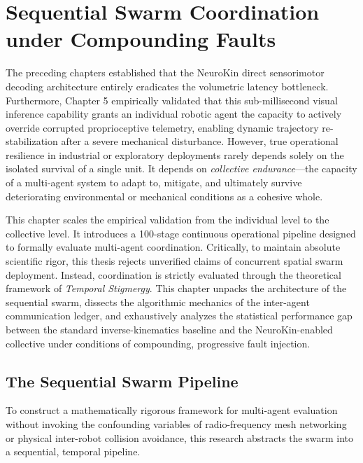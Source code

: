 \documentclass[12pt,a4paper,oneside]{report}
\begin{document}
\chapter{Sequential Swarm Coordination under Compounding Faults}

The preceding chapters established that the NeuroKin direct sensorimotor decoding architecture entirely eradicates the volumetric latency bottleneck. Furthermore, Chapter 5 empirically validated that this sub-millisecond visual inference capability grants an individual robotic agent the capacity to actively override corrupted proprioceptive telemetry, enabling dynamic trajectory re-stabilization after a severe mechanical disturbance. However, true operational resilience in industrial or exploratory deployments rarely depends solely on the isolated survival of a single unit. It depends on \textit{collective endurance}—the capacity of a multi-agent system to adapt to, mitigate, and ultimately survive deteriorating environmental or mechanical conditions as a cohesive whole.

This chapter scales the empirical validation from the individual level to the collective level. It introduces a 100-stage continuous operational pipeline designed to formally evaluate multi-agent coordination. Critically, to maintain absolute scientific rigor, this thesis rejects unverified claims of concurrent spatial swarm deployment. Instead, coordination is strictly evaluated through the theoretical framework of \textit{Temporal Stigmergy}. This chapter unpacks the architecture of the sequential swarm, dissects the algorithmic mechanics of the inter-agent communication ledger, and exhaustively analyzes the statistical performance gap between the standard inverse-kinematics baseline and the NeuroKin-enabled collective under conditions of compounding, progressive fault injection.

\section{The Sequential Swarm Pipeline}

To construct a mathematically rigorous framework for multi-agent evaluation without invoking the confounding variables of radio-frequency mesh networking or physical inter-robot collision avoidance, this research abstracts the swarm into a sequential, temporal pipeline. 
\end{document}
